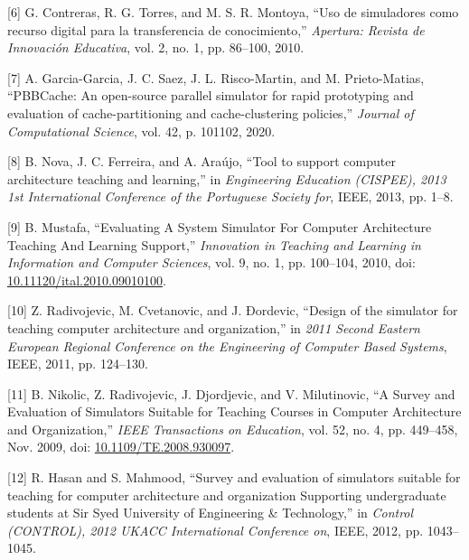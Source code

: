 \documentclass[12pt,twoside]{templates/unerthesis}
\begin{document}
\leavevmode\hypertarget{ref-contreras_uso_2010}{}%
{[}6{]} G. Contreras, R. G. Torres, and M. S. R. Montoya, ``Uso de simuladores como recurso digital para la transferencia de conocimiento,'' \emph{Apertura: Revista de Innovación Educativa}, vol. 2, no. 1, pp. 86--100, 2010.

\leavevmode\hypertarget{ref-garcia-garcia_pbbcache_2020}{}%
{[}7{]} A. Garcia-Garcia, J. C. Saez, J. L. Risco-Martin, and M. Prieto-Matias, ``PBBCache: An open-source parallel simulator for rapid prototyping and evaluation of cache-partitioning and cache-clustering policies,'' \emph{Journal of Computational Science}, vol. 42, p. 101102, 2020.

\leavevmode\hypertarget{ref-nova_tool_2013}{}%
{[}8{]} B. Nova, J. C. Ferreira, and A. Araújo, ``Tool to support computer architecture teaching and learning,'' in \emph{Engineering Education (CISPEE), 2013 1st International Conference of the Portuguese Society for}, IEEE, 2013, pp. 1--8.

\leavevmode\hypertarget{ref-mustafa_evaluating_2010}{}%
{[}9{]} B. Mustafa, ``Evaluating A System Simulator For Computer Architecture Teaching And Learning Support,'' \emph{Innovation in Teaching and Learning in Information and Computer Sciences}, vol. 9, no. 1, pp. 100--104, 2010, doi: \href{https://doi.org/10.11120/ital.2010.09010100}{10.11120/ital.2010.09010100}.

\leavevmode\hypertarget{ref-radivojevic_design_2011}{}%
{[}10{]} Z. Radivojevic, M. Cvetanovic, and J. Ðordevic, ``Design of the simulator for teaching computer architecture and organization,'' in \emph{2011 Second Eastern European Regional Conference on the Engineering of Computer Based Systems}, IEEE, 2011, pp. 124--130.

\leavevmode\hypertarget{ref-nikolic_survey_2009}{}%
{[}11{]} B. Nikolic, Z. Radivojevic, J. Djordjevic, and V. Milutinovic, ``A Survey and Evaluation of Simulators Suitable for Teaching Courses in Computer Architecture and Organization,'' \emph{IEEE Transactions on Education}, vol. 52, no. 4, pp. 449--458, Nov. 2009, doi: \href{https://doi.org/10.1109/TE.2008.930097}{10.1109/TE.2008.930097}.

\leavevmode\hypertarget{ref-hasan_survey_2012}{}%
{[}12{]} R. Hasan and S. Mahmood, ``Survey and evaluation of simulators suitable for teaching for computer architecture and organization Supporting undergraduate students at Sir Syed University of Engineering \& Technology,'' in \emph{Control (CONTROL), 2012 UKACC International Conference on}, IEEE, 2012, pp. 1043--1045.
\end{document}
